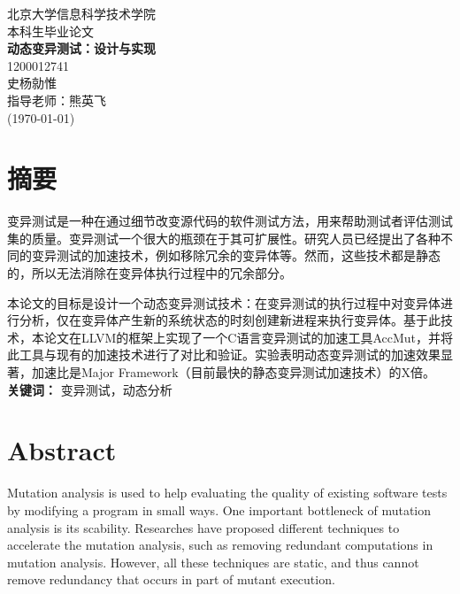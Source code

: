 \documentclass[nofonts]{ctexrep}
\begin{document}
%
\begin{titlepage}
\begin{center}
\LARGE

\vspace{20mm}
北京大学信息科学技术学院\\
\vspace{5mm}
本科生毕业论文\\
\vspace{70mm}
\textbf{\huge 动态变异测试：设计与实现}\\
\vspace{20mm}
1200012741\\
史杨勍惟\\
\vspace{20mm}
指导老师：熊英飞\\
\vspace{10mm}
(\today)
\end{center}
\end{titlepage}

\renewcommand{\baselinestretch}{1.5}

\large
\chapter*{摘要}
变异测试是一种在通过细节改变源代码的软件测试方法，用来帮助测试者评估测试集的质量。变异测试一个很大的瓶颈在于其可扩展性。研究人员已经提出了各种不同的变异测试的加速技术，例如移除冗余的变异体等。然而，这些技术都是静态的，所以无法消除在变异体执行过程中的冗余部分。

本论文的目标是设计一个动态变异测试技术：在变异测试的执行过程中对变异体进行分析，仅在变异体产生新的系统状态的时刻创建新进程来执行变异体。基于此技术，本论文在LLVM的框架上实现了一个C语言变异测试的加速工具AccMut，并将此工具与现有的加速技术进行了对比和验证。实验表明动态变异测试的加速效果显著，加速比是Major Framework（目前最快的静态变异测试加速技术）的X倍。\\

\textbf{关键词：} 变异测试，动态分析
\chapter*{Abstract}
Mutation analysis is used to help evaluating the quality of existing software tests by modifying a program in small ways. One important bottleneck of mutation analysis is its scability. Researches have proposed different techniques to accelerate the mutation analysis, such as removing redundant computations in mutation analysis. However, all these techniques are static, and thus cannot remove redundancy that occurs in part of mutant execution. 
\end{document}
